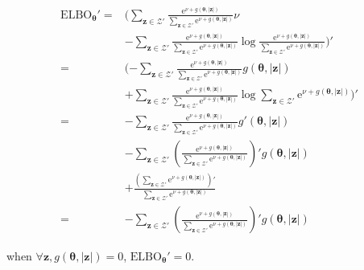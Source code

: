 \documentclass[notitlepage]{article}
\begin{document}
\begin{align}
    \mathrm{ELBO}_{\bm{\theta}}' =& (\sum_{\bm{z}\in\mathcal{Z}'}\frac{\mathrm{e}^{\nu+g(\bm{\theta},|\bm{z}|)}}{\sum_{\bm{z}\in\mathcal{Z}'}\mathrm{e}^{\nu+g(\bm{\theta},|\bm{z}|)}}\nu \\
    &- \sum_{\bm{z}\in\mathcal{Z}'}\frac{\mathrm{e}^{\nu+g(\bm{\theta},|\bm{z}|)}}{\sum_{\bm{z}\in\mathcal{Z}'}\mathrm{e}^{\nu+g(\bm{\theta},|\bm{z}|)}}\log\frac{\mathrm{e}^{\nu+g(\bm{\theta},|\bm{z}|)}}{\sum_{\bm{z}\in\mathcal{Z}'}\mathrm{e}^{\nu+g(\bm{\theta},|\bm{z}|)}})' \\
    =& (-\sum_{\bm{z}\in\mathcal{Z}'}\frac{\mathrm{e}^{\nu+g(\bm{\theta},|\bm{z}|)}}{\sum_{\bm{z}\in\mathcal{Z}'}\mathrm{e}^{\nu+g(\bm{\theta},|\bm{z}|)}}g(\bm{\theta},|\bm{z}|) \\
    &+ \sum_{\bm{z}\in\mathcal{Z}'}\frac{\mathrm{e}^{\nu+g(\bm{\theta},|\bm{z}|)}}{\sum_{\bm{z}\in\mathcal{Z}'}\mathrm{e}^{\nu+g(\bm{\theta},|\bm{z}|)}}\log\sum_{\bm{z}\in\mathcal{Z}'}\mathrm{e}^{\nu+g(\bm{\theta},|\bm{z}|)})' \\
    =& -\sum_{\bm{z}\in\mathcal{Z}'}\frac{\mathrm{e}^{\nu+g(\bm{\theta},|\bm{z}|)}}{\sum_{\bm{z}\in\mathcal{Z}'}\mathrm{e}^{\nu+g(\bm{\theta},|\bm{z}|)}}g'(\bm{\theta},|\bm{z}|) \\
    &- \sum_{\bm{z}\in\mathcal{Z}'}(\frac{\mathrm{e}^{\nu+g(\bm{\theta},|\bm{z}|)}}{\sum_{\bm{z}\in\mathcal{Z}'}\mathrm{e}^{\nu+g(\bm{\theta},|\bm{z}|)}})'g(\bm{\theta},|\bm{z}|) \\
    &+ \frac{(\sum_{\bm{z}\in\mathcal{Z}'}\mathrm{e}^{\nu+g(\bm{\theta},|\bm{z}|)})'}{\sum_{\bm{z}\in\mathcal{Z}'}\mathrm{e}^{\nu+g(\bm{\theta},|\bm{z}|)}} \\
    =& -\sum_{\bm{z}\in\mathcal{Z}'}(\frac{\mathrm{e}^{\nu+g(\bm{\theta},|\bm{z}|)}}{\sum_{\bm{z}\in\mathcal{Z}'}\mathrm{e}^{\nu+g(\bm{\theta},|\bm{z}|)}})'g(\bm{\theta},|\bm{z}|)
\end{align}

when $\forall \bm{z}, g(\bm{\theta},|\bm{z}|)=0$, $\mathrm{ELBO}_{\bm{\theta}}'=0$. 

\end{document}

